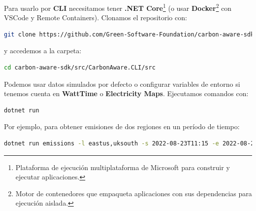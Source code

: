 \documentclass[12pt,a4paper]{report}
\begin{document}
Para usarlo por \textbf{CLI} necesitamos
tener \textbf{.NET Core}\footnote{Plataforma de ejecución multiplataforma de
  Microsoft para construir y ejecutar aplicaciones.} (o usar
\textbf{Docker}\footnote{Motor de contenedores que empaqueta aplicaciones con
  sus dependencias para ejecución aislada.} con VSCode y Remote Containers).
Clonamos el repositorio con:

\begin{tcolorbox}[colback=codebackground, colframe=codeborder, boxrule=0.8pt, arc=0mm, boxsep=5pt, left=5pt, right=5pt, top=5pt, bottom=5pt]
  \begin{lstlisting}[language=bash]
git clone https://github.com/Green-Software-Foundation/carbon-aware-sdk.git
\end{lstlisting}
\end{tcolorbox}

y accedemos a la carpeta:

\begin{tcolorbox}[colback=codebackground, colframe=codeborder, boxrule=0.8pt, arc=0mm, boxsep=5pt, left=5pt, right=5pt, top=5pt, bottom=5pt]
  \begin{lstlisting}[language=bash]
cd carbon-aware-sdk/src/CarbonAware.CLI/src
\end{lstlisting}
\end{tcolorbox}

Podemos usar datos simulados por defecto o configurar variables de entorno si
tenemos cuenta en \textbf{WattTime} o
\textbf{Electricity Maps}. Ejecutamos
comandos con:

\begin{tcolorbox}[colback=codebackground, colframe=codeborder, boxrule=0.8pt, arc=0mm, boxsep=5pt, left=5pt, right=5pt, top=5pt, bottom=5pt]
  \begin{lstlisting}[language=bash]
dotnet run
\end{lstlisting}
\end{tcolorbox}

Por ejemplo, para obtener emisiones de dos regiones en un período de tiempo:

\begin{tcolorbox}[colback=codebackground, colframe=codeborder, boxrule=0.8pt, arc=0mm, boxsep=5pt, left=5pt, right=5pt, top=5pt, bottom=5pt]
  \begin{lstlisting}[language=bash]
dotnet run emissions -l eastus,uksouth -s 2022-08-23T11:15 -e 2022-08-23T11:20
\end{lstlisting}
\end{tcolorbox}
\end{document}
